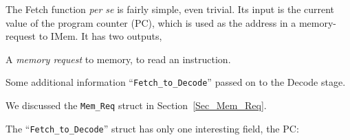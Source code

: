 \label{Sec_fn_Fetch}


The Fetch function \emph{per se} is fairly simple, even trivial.  Its
input is the current value of the program counter (PC), which is used
as the address in a memory-request to IMem.  It has two outputs,

\begin{tightlist}

 \item A \emph{memory request} to memory, to read an instruction.

 \item Some additional information ``\verb|Fetch_to_Decode|'' passed
       on to the Decode stage.

\end{tightlist}

We discussed the \verb|Mem_Req| struct in Section~\ref{Sec_Mem_Req}.

The ``\verb|Fetch_to_Decode|'' struct has only one interesting field,
the PC:


\vspace{2ex}

